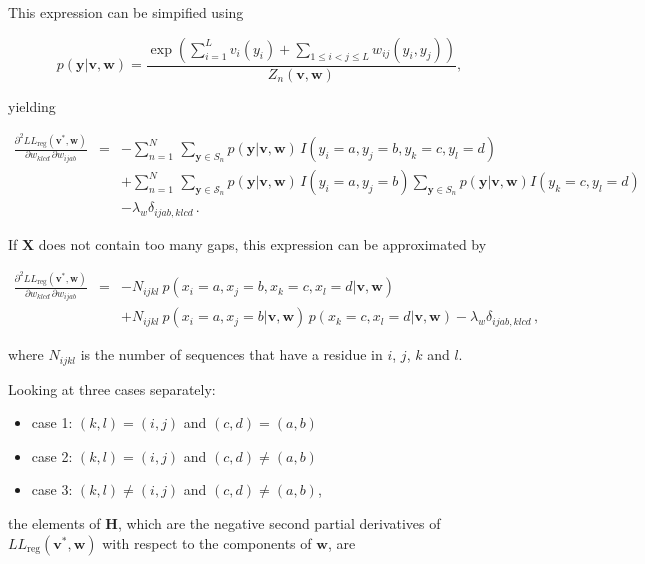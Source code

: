 \documentclass[11pt,a4paper,twoside]{book}
\providecommand{\tightlist}{%
  \setlength{\itemsep}{0pt}\setlength{\parskip}{0pt}}
\newcommand{\eq}{\!=\!}
\renewcommand{\H}{\mathbf{H}}
\newcommand{\LLreg}{L\!L_\mathrm{reg}}
\newcommand{\Sn}{S_n}
\renewcommand{\v}{\mathbf{v}}
\newcommand{\w}{\mathbf{w}}
\newcommand{\wijab}{w_{ijab}}
\newcommand{\wklcd}{w_{klcd}}
\newcommand{\X}{\mathbf{X}}
\theoremstyle{definition}
\theoremstyle{definition}
\theoremstyle{remark}
\begin{document}
This expression can be simpified using

\begin{equation}
    p(\mathbf{y} | \v,\w) = \frac{\exp \left( \sum_{i=1}^L v_i(y_i) + \sum_{1 \le i < j \le L} w_{ij}(y_i,y_j) \right)}{Z_n(\v,\w)}  ,
\end{equation}

yielding

\begin{eqnarray}
    \frac{\partial^2 \LLreg(\v^*,\w)}{\partial \wklcd \, \partial \wijab} 
    &=& -  \sum_{n=1}^{N} \, \sum_{\mathbf{y} \in \Sn} p(\mathbf{y} | \v,\w) \, I(y_i \eq a, y_j \eq b, y_k \eq c, y_l \eq d) \nonumber \\
    && + \sum_{n=1}^{N} \, \sum_{\mathbf{y} \in \mathcal{S}_n} p(\mathbf{y} | \v,\w) \, I(y_i \eq a, y_j \eq b ) \sum_{\mathbf{y} \in \Sn} p(\mathbf{y} | \v,\w)  I(y_k \eq c, y_l \eq d ) \nonumber \\
    && - \lambda_w \delta_{ijab,klcd} \,.
\end{eqnarray}

If \(\X\) does not contain too many gaps, this expression can be
approximated by

\begin{eqnarray}
    \frac{\partial^2 \LLreg(\v^*,\w)}{\partial \wklcd \, \partial \wijab  } 
    &=& - N_{ijkl} \: p(x_i \eq a, x_j \eq b, x_k \eq c, x_l \eq d | \v,\w)  \nonumber \\
    && +  N_{ijkl} \: p(x_i \eq a, x_j \eq b | \v,\w) \, p(x_k \eq c, x_l \eq d | \v,\w) - \lambda_w \delta_{ijab,klcd} \,,
\end{eqnarray}

where \(N_{ijkl}\) is the number of sequences that have a residue in
\(i\), \(j\), \(k\) and \(l\).

Looking at three cases separately:

\begin{itemize}
\tightlist
\item
  case 1: \((k,l) = (i,j)\) and \((c,d) = (a,b)\)
\item
  case 2: \((k,l) = (i,j)\) and \((c,d) \ne (a,b)\)
\item
  case 3: \((k,l) \ne (i,j)\) and \((c,d) \ne (a,b)\),
\end{itemize}

the elements of \(\H\), which are the negative second partial
derivatives of \(\LLreg(\v^*,\w)\) with respect to the components of
\(\w\), are
\end{document}
